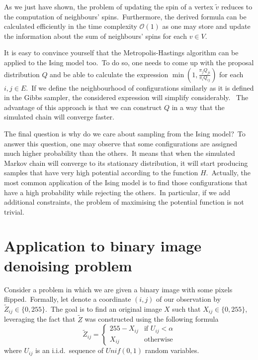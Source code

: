 \documentclass[shortabstract, english, lic]{iithesis}
\theoremstyle{default_theorem_style}\newtheorem{theorem}{Theorem}
\theoremstyle{default_theorem_style}\newtheorem{definition}{Definition}
\begin{document}
\noindent As we just have shown, the problem of updating the spin of a vertex $\tilde{v}$ reduces to the computation of
neighbours' spins.\ Furthermore, the derived formula can be calculated efficiently in the time
complexity $\mathcal{O}(1)$ as one may store and update the information about the sum of neighbours'
spins for each $v \in V$.\newline

\noindent It is easy to convince yourself that the Metropolis-Hastings algorithm can be applied to the Ising model
too.\ To do so, one needs to come up with the proposal distribution $Q$ and be able to calculate the expression
$\min{(1, \frac{\pi_j Q_{ji}}{\pi_i Q_{ij}})}$ for each $i, j \in E$.\ If we define the neighbourhood of configurations
similarly as it is defined in the Gibbs sampler, the considered expression will simplify considerably. \ The
advantage of this approach is that we can construct $Q$ in a way that the simulated chain will converge faster.\newline

\noindent The final question is why do we care about sampling from the Ising model?\ To answer this question, one may
observe that some configurations are assigned much higher probability than the others.\ It means that when the simulated
Markov chain will converge to its stationary distribution, it will start producing samples that have very high
potential according to the function $H$.\ Actually, the most common application of the Ising model is to find
those configurations that have a high probability while rejecting the others.\ In particular, if we add
additional constraints, the problem of maximising the potential function is not trivial.

\section{Application to binary image denoising problem} \label{sec:binary_images_problem}

Consider a problem in which we are given a binary image with some pixels flipped.\ Formally, let denote a coordinate
$(i, j)$ of our observation by $\tilde{Z}_{ij} \in \{0, 255\}$.\ The goal is to find an original image $X$ such that
$X_{ij} \in \{0, 255\}$, leveraging the fact that $\tilde{Z}$ was constructed using the following formula
$$
\tilde{Z}_{ij} =
\begin{cases}
  255 - X_{ij} &\text{if $U_{ij} < \alpha$}\\
  X_{ij} &\text{otherwise}
\end{cases}
$$
where $U_{ij}$ is an i.i.d.\ sequence of $Unif(0, 1)$ random variables.\newline
\end{document}
